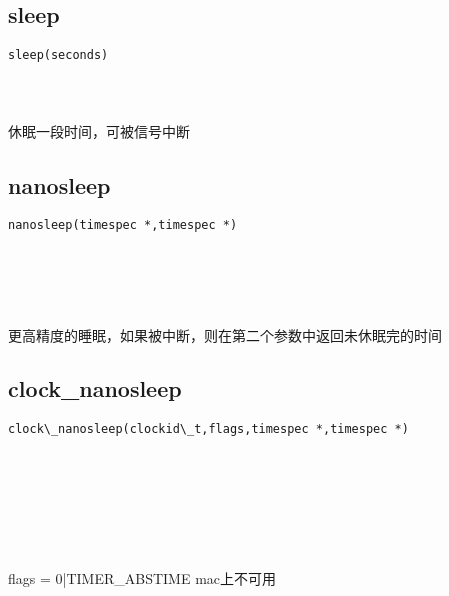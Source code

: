 \documentclass[10pt,a4paper]{article}
\begin{document}
\subsection{sleep}
\begin{spacing}{2.0}
\lstset{language=C,numbers=none}
\begin{lstlisting}
sleep(seconds)
\end{lstlisting}
{\large\color[rgb]{0.2,0.4,0.6}{seconds:}}
\paragraph{ \ \ }休眠一段时间，可被信号中断
\end{spacing}

\subsection{nanosleep}
\begin{spacing}{2.0}
\lstset{language=C,numbers=none}
\begin{lstlisting}
nanosleep(timespec *,timespec *)
\end{lstlisting}
{\large\color[rgb]{0.2,0.4,0.6}{*:}} \\
{\large\color[rgb]{0.2,0.4,0.6}{*:}}
\paragraph{ \ \ }更高精度的睡眠，如果被中断，则在第二个参数中返回未休眠完的时间
\end{spacing}

\subsection{clock\_nanosleep}
\begin{spacing}{2.0}
\lstset{language=C,numbers=none}
\begin{lstlisting}
clock\_nanosleep(clockid\_t,flags,timespec *,timespec *)
\end{lstlisting}
{\large\color[rgb]{0.2,0.4,0.6}{clockid\_t:}} \\
{\large\color[rgb]{0.2,0.4,0.6}{flags:}} \\
{\large\color[rgb]{0.2,0.4,0.6}{*:}} \\
{\large\color[rgb]{0.2,0.4,0.6}{*:}}
\paragraph{ \ \ }flags = 0|TIMER\_ABSTIME mac上不可用
\end{spacing}
\end{document}
